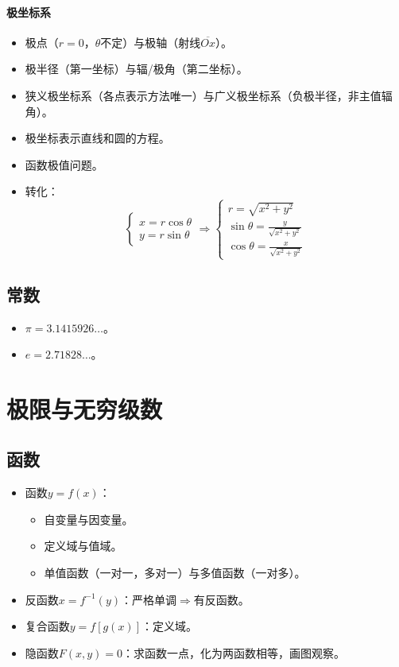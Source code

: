 \documentclass[
12pt, %
a4paper, 
oneside, %
]{scrartcl}
\begin{document}
\paragraph{极坐标系}
\begin{itemize}
\item 极点（$ r = 0 $，$ \theta $不定）与极轴（射线$ \overline{Ox} $）。
\item 极半径（第一坐标）与辐/极角（第二坐标）。
\item 狭义极坐标系（各点表示方法唯一）与广义极坐标系（负极半径，非主值辐角）。
\item 极坐标表示直线和圆的方程。
\item 函数极值问题。
\item 转化：
$$ \begin{cases} x = r \cos\theta \\ y = r \sin\theta \end{cases} \Longrightarrow \begin{cases} r = \sqrt{x^2 + y^2} \\ \sin\theta = \frac{y}{\sqrt{x^2 + y^2}} \\ \cos\theta = \frac{x}{\sqrt{x^2 + y^2}} \end{cases} $$
\end{itemize}
\subsection[常数]{常数}
\begin{itemize}
\item $ \pi = 3.1415926 \dots $。
\item $ e = 2.71828 \dots $。
\end{itemize}
\section{极限与无穷级数}
\subsection[函数]{函数}
\begin{itemize}
\item 函数$ y = f(x) $：
\begin{itemize}
\item 自变量与因变量。
\item 定义域与值域。
\item 单值函数（一对一，多对一）与多值函数（一对多）。
\end{itemize}
\item 反函数$ x = f^{-1}(y) $：严格单调$ \Rightarrow $有反函数。
\item 复合函数$ y = f[g(x)] $：定义域。
\item 隐函数$ F(x, y) = 0 $：求函数一点，化为两函数相等，画图观察。
\end{itemize}
\end{document}

